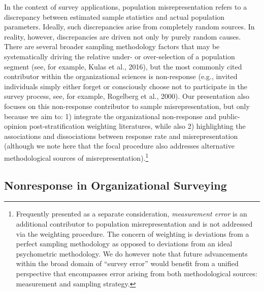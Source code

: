 \documentclass[
  man,mask]{apa7}
\begin{document}
In the context of survey applications, population misrepresentation refers to a discrepancy between estimated sample statistics and actual population parameters. Ideally, such discrepancies arise from completely random sources. In reality, however, discrepancies are driven not only by purely random causes. There are several broader sampling methodology factors that may be systematically driving the relative under- or over-selection of a population segment (see, for example, Kulas et al., 2016), but the most commonly cited contributor within the organizational sciences is non-response (e.g., invited individuals simply either forget or consciously choose not to participate in the survey process, see, for example, Rogelberg et al., 2000). Our presentation also focuses on this non-response contributor to sample misrepresentation, but only because we aim to: 1) integrate the organizational non-response and public-opinion post-stratification weighting literatures, while also 2) highlighting the associations and dissociations between response rate and misrepresentation (although we note here that the focal procedure also addresses alternative methodological sources of misrepresentation).\footnote{Frequently presented as a separate consideration, \emph{measurement error} is an additional contributor to population misrepresentation and is not addressed via the weighting procedure. The concern of weighting is deviations from a perfect sampling methodology as opposed to deviations from an ideal psychometric methodology. We do however note that future advancements within the broad domain of ``survey error'' would benefit from a unified perspective that encompasses error arising from both methodological sources: measurement and sampling strategy.}

\subsection{Nonresponse in Organizational Surveying}\label{nonresponse-in-organizational-surveying}
\end{document}
